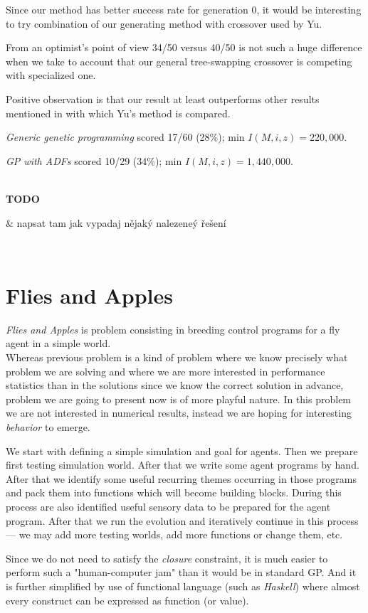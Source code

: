\documentclass[12pt,a4paper]{report}
\newenvironment{todo}
{ ~\\[0.5em]
  {\color{red}\textbf{TODO}}
  \begin{easylist}[itemize]}
{ \end{easylist}
  ~}
\begin{document}
Since our method has better success rate for generation 0, it would 
be interesting to try combination of our generating 
method with crossover used by Yu.

From an optimist's point of view 34/50 versus 40/50 
is not such a huge difference when we take to account that
our general tree-swapping crossover is competing with specialized one.   

Positive observation is that our result at least outperforms 
other results mentioned in \cite{yu01} with which Yu's method is compared.


\textit{Generic genetic programming} scored 17/60 (28\%); 
min $I(M,i,z) = 220,000$.

\textit{GP with ADFs} scored 10/29 (34\%); 
min $I(M,i,z) = 1,440,000$.




\begin{todo}
& napsat tam jak vypadaj nějaký nalezeneý řešení
\end{todo} 

\section{Flies and Apples}

\textit{Flies and Apples} is problem consisting in breeding 
control programs for a fly agent in a simple world.\\ 

Whereas previous problem is a kind of problem where we know precisely
what problem we are solving and where we are more interested in 
performance statistics than in the solutions since we know the correct solution in 
advance, problem we are going to present now is of more playful nature.
In this problem we are not interested in numerical results, instead 
we are hoping for interesting \textit{behavior} to emerge.

We start with defining a simple simulation and goal for agents.
Then we prepare first testing simulation world. 
After that we write some agent programs by hand. After that we 
identify some useful recurring 
themes occurring in those programs and pack them into functions
which will become building blocks. During this process are also identified
useful sensory data to be prepared for the agent program.
After that we run the evolution and
iteratively continue in this process  --- we may add more testing worlds,
add more functions or change them, etc.
      
Since we do not need to satisfy the \textit{closure} constraint, 
it is much easier to perform such a "human-computer jam" than it
would be in standard GP. And it is further simplified by use of
functional language (such as \textit{Haskell}) where almost
every construct can be expressed as function (or value).
\end{document}
